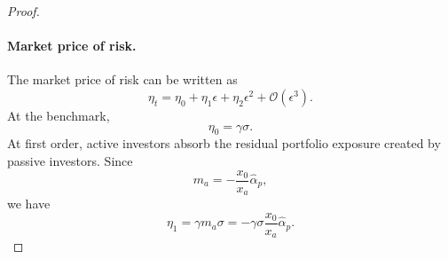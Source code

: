 \begin{proof}
\paragraph{Market price of risk.}
The market price of risk can be written as
\begin{equation}
    \eta_t = \eta_0 + \eta_1 \epsilon + \eta_2 \epsilon^2 + \mathcal{O}(\epsilon^3).
\end{equation}
At the benchmark,
\begin{equation}
    \eta_0=\gamma\sigma.
\end{equation}
At first order, active investors absorb the residual portfolio exposure created by passive investors.
Since
\begin{equation}
    m_a=-\frac{x_0}{x_a}\hat{\alpha}_p,
\end{equation}
we have
\begin{equation}
    \eta_1=\gamma m_a\sigma
    =-\gamma\sigma\frac{x_0}{x_a}\hat{\alpha}_p.
\end{equation}


\end{proof}
